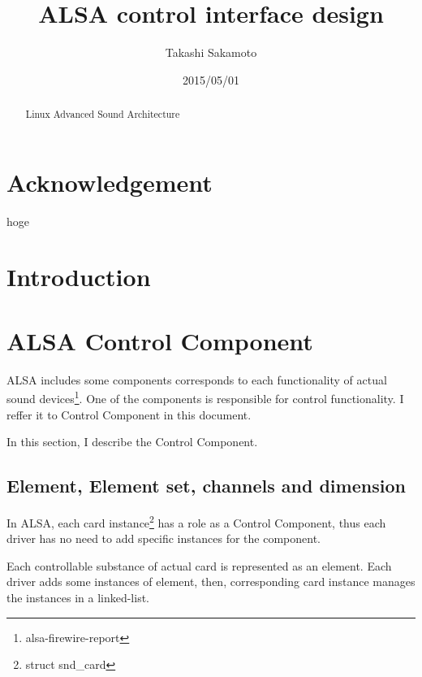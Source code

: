 \documentclass[onecolumn]{article}
\begin{document}

\title{ALSA control interface design}
\author{Takashi Sakamoto}
\date{2015/05/01}
\maketitle{}

\begin{abstract}

Linux Advanced Sound Architecture

\end{abstract}

\section*{Acknowledgement}

hoge

\newpage

\tableofcontents

\newpage


\section{Introduction}

\section{ALSA Control Component}

ALSA includes some components corresponds to each functionality of actual sound devices\footnote{alsa-firewire-report}. One of the components is responsible for control functionality. I reffer it to Control Component in this document.

In this section, I describe the Control Component.

\subsection{Element, Element set, channels and dimension}

In ALSA, each card instance\footnote{struct snd\_card} has a role as a Control Component, thus each driver has no need to add specific instances for the component.

Each controllable substance of actual card is represented as an element. Each driver adds some instances of element, then, corresponding card instance manages the instances in a linked-list.
\end{document}
